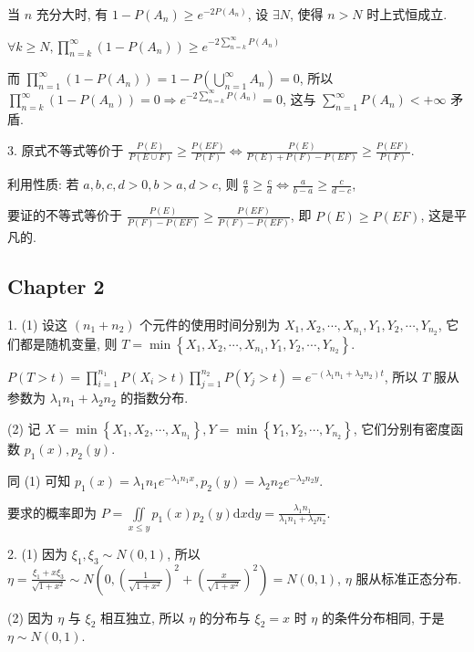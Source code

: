 \documentclass[UTF8]{ctexart}
\begin{document}
当 $n$ 充分大时, 有 $\displaystyle1-P(A_n)\geq e^{-2P(A_n)}$, 设 $\exists N$, 使得 $n>N$ 时上式恒成立.

$\displaystyle\forall k\geq N, \prod_{n=k}^{\infty}(1-P(A_n))\geq e^{-2\sum\limits_{n=k}^{\infty}P(A_n)}$

而 $\displaystyle\prod_{n=1}^{\infty}\left(1-P(A_n)\right)=1-P\left(\bigcup_{n=1}^{\infty}A_n\right)=0$, 所以 $\displaystyle\prod_{n=k}^{\infty}\left(1-P(A_n)\right)=0\Rightarrow e^{-2\sum\limits_{n=k}^{\infty}P(A_n)}=0$, 这与 $\displaystyle\sum\limits_{n=1}^{\infty}P(A_n)<+\infty$ 矛盾.

3. 原式不等式等价于 $\displaystyle\frac{P(E)}{P(E\cup F)}\geq\frac{P(EF)}{P(F)}\Leftrightarrow\frac{P(E)}{P(E)+P(F)-P(EF)}\geq\frac{P(EF)}{P(F)}$.

利用性质: 若 $a,b,c,d>0, b>a, d>c$, 则 $\displaystyle \frac{a}{b}\geq\frac{c}{d}\Leftrightarrow\frac{a}{b-a}\geq\frac{c}{d-c}$,

要证的不等式等价于 $\displaystyle \frac{P(E)}{P(F)-P(EF)}\geq\frac{P(EF)}{P(F)-P(EF)}$, 即 $P(E)\geq P(EF)$, 这是平凡的.

\subsection*{Chapter 2}
1. (1) 设这 $(n_1+n_2)$ 个元件的使用时间分别为 $X_1,X_2,\cdots,X_{n_1},Y_1,Y_2,\cdots,Y_{n_2}$, 它们都是随机变量, 则 $T=\min\left\{X_1,X_2,\cdots,X_{n_1},Y_1,Y_2,\cdots,Y_{n_2}\right\}$.

$\displaystyle P(T>t)=\prod_{i=1}^{n_1}P(X_i>t)\prod_{j=1}^{n_2}P(Y_j>t)=e^{-(\lambda_1n_1+\lambda_2n_2)t}$, 所以 $T$ 服从参数为 $\lambda_1n_1+\lambda_2n_2$ 的指数分布.

(2) 记 $X=\min\left\{X_1,X_2,\cdots,X_{n_1}\right\}, Y=\min\left\{Y_1,Y_2,\cdots,Y_{n_2}\right\}$, 它们分别有密度函数 $p_1(x),p_2(y)$.

同 (1) 可知 $\displaystyle p_1(x)=\lambda_1n_1e^{-\lambda_1n_1x}, p_2(y)=\lambda_2n_2e^{-\lambda_2n_2y}$.

要求的概率即为 $\displaystyle P=\iint\limits_{x\leq y}p_1(x)p_2(y)\text{d}x\text{d}y=\frac{\lambda_1n_1}{\lambda_1n_1+\lambda_2n_2}$.

2. (1) 因为 $\xi_1,\xi_3\sim N(0,1)$, 所以 $\displaystyle\eta=\frac{\xi_1+x\xi_3}{\sqrt{1+x^2}}\sim N\left(0,\left(\frac{1}{\sqrt{1+x^2}}\right)^2+\left(\frac{x}{\sqrt{1+x^2}}\right)^2\right)=N(0,1)$, $\eta$ 服从标准正态分布.

(2) 因为 $\eta$ 与 $\xi_2$ 相互独立, 所以 $\eta$ 的分布与 $\xi_2=x$ 时 $\eta$ 的条件分布相同, 于是 $\eta\sim N(0,1)$.
\end{document}
